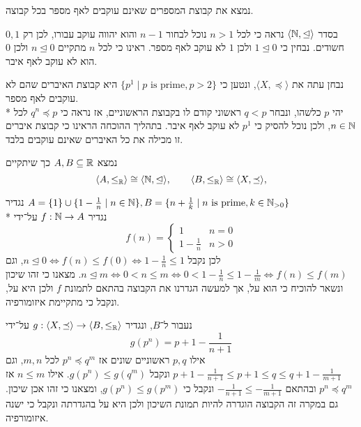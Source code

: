 \Subquestion{}
נמצא את קבוצת המספרים שאינם עוקבים לאף מספר בכל קבוצה.

בסדר $\langle \mathbb{N}, \trianglelefteq \rangle$
נראה כי לכל $n > 1$ נוכל לבחור $n - 1$ והוא יהווה עוקב עבורו, לכן רק $0, 1$ חשודים.
נבחין כי $1 \trianglelefteq 0$ ולכן $1$ לא עוקב לאף מספר.
ראינו כי לכל $n$ מתקיים $n \trianglelefteq 0$ ולכן $0$ הוא לא עוקב לאף איבר.

נבחן עתה את $\langle X, \preceq \rangle$, ונטען כי $\{ p^1 \mid p \text{ is prime}, p > 2 \}$ היא קבוצת האיברים שהם לא עוקבים לאף מספר. \\*
יהי $p$ כלשהו, ונבחר $q < p$ ראשוני קודם לו בקבוצת הראשוניים, אז נראה כי $q^n \preceq p$ לכל $n \in \mathbb{N}$, ולכן נוכל להסיק כי $p^1$ לא עוקב לאף איבר.
בתהליך ההוכחה הראינו כי קבוצת איברים זו מכילה את כל האיברים שאינם עוקבים בלבד.

\Subquestion{}
נמצא $A, B \subseteq \mathbb{R}$ כך שיתקיים
\[
	\langle A, \le_{\mathbb{R}} \rangle \cong \langle \mathbb{N}, \trianglelefteq \rangle,
	\qquad
	\langle B, \le_{\mathbb{R}} \rangle \cong \langle X, \preceq \rangle,
\]

נגדיר $A = \{1\} \cup \{ 1 - \frac{1}{n} \mid n \in \mathbb{N} \}, B = \{ n + \frac{1}{k} \mid n \text{ is prime}, k \in \mathbb{N}_{>0} \}$ \\*
נגדיר $f : \mathbb{N} \to A$ על־ידי
\[
	f(n) = \begin{cases}
		1 & n = 0 \\
		1 - \frac{1}{n} & n > 0
	\end{cases}
\]
לכן נקבל $n \trianglelefteq 0 \iff f(n) \le f(0) \iff 1 - \frac{1}{n} \le 1$, וגם $n \trianglelefteq m \iff 0 < n \le m \iff 0 < 1 - \frac{1}{n} \le 1 - \frac{1}{m} \iff f(n) \le f(m)$.
מצאנו כי זהו שיכון ונשאר להוכיח כי הוא על, אך למעשה הגדרנו את הקבוצה בהתאם לתמונת $f$ ולכן היא על, ונקבל כי מתקיימת איזומורפיה.

נעבור ל־$B$, ונגדיר $g : \langle X, \preceq \rangle \to \langle B, \le_{\mathbb{R}}\rangle$ על־ידי
\[
	g(p^n) = p + 1 - \frac{1}{n + 1}
\]
אילו $p, q$ ראשוניים שונים אז $p^n \preceq q^m$ לכל $m, n$, וגם $p + 1 - \frac{1}{n + 1} \le p + 1 \le q \le q + 1 - \frac{1}{m + 1}$ ונקבל $g(p^n) \le g(q^m)$.
אילו $n \le m$ אז $p^n \preceq q^m$ ובהתאם $-\frac{1}{n + 1} \le -\frac{1}{m + 1}$ ונקבל כי $g(p^n) \le g(p^m)$, ומצאנו כי זהו אכן שיכון.
גם במקרה זה הקבוצה הוגדרה להיות תמונת השיכון ולכן היא על בהגדרתה ונקבל כי ישנה איזומורפיה.


